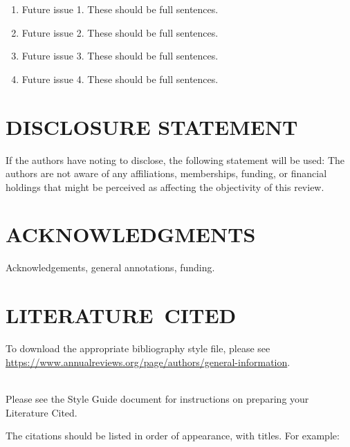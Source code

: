 \documentclass{ar-1col-S2O}
\begin{document}
\begin{issues}
\begin{enumerate}
\item Future issue 1. These should be full sentences.
\item Future issue 2. These should be full sentences.
\item Future issue 3. These should be full sentences.
\item Future issue 4. These should be full sentences.
\end{enumerate}
\end{issues}

\section*{DISCLOSURE STATEMENT}
If the authors have noting to disclose, the following statement will be used: The authors are not aware of any affiliations, memberships, funding, or financial holdings that
might be perceived as affecting the objectivity of this review. 

\section*{ACKNOWLEDGMENTS}
Acknowledgements, general annotations, funding.

%
\section*{LITERATURE\ CITED}

To download the appropriate bibliography style file, please see \url{https://www.annualreviews.org/page/authors/general-information}. 

\\

\noindent
Please see the Style Guide document for instructions on preparing your Literature Cited.

The citations should be listed in order of appearance, with titles. For example:
\end{document}
